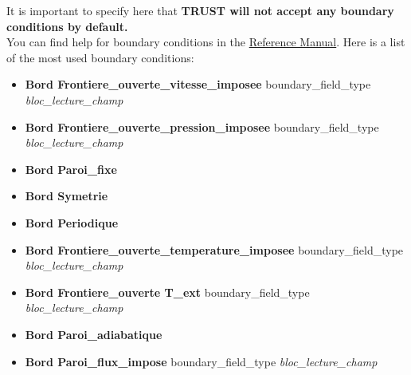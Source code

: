 It is important to specify here that \textbf{TRUST will not accept any boundary conditions by default.}\\

You can find help for boundary conditions in the \href{TRUST_Reference_Manual.pdf\#condlimbase}{\trust Reference Manual}.
Here is a list of the most used boundary conditions:
{\small{
\begin{itemize}
\item \textbf{Bord Frontiere\_ouverte\_vitesse\_imposee}    boundary\_field\_type \textit{bloc\_lecture\_champ}
\item \textbf{Bord Frontiere\_ouverte\_pression\_imposee}   boundary\_field\_type \textit{bloc\_lecture\_champ}
\item \textbf{Bord Paroi\_fixe}
\item \textbf{Bord Symetrie}
\item \textbf{Bord Periodique}
\item \textbf{Bord Frontiere\_ouverte\_temperature\_imposee}                        boundary\_field\_type \textit{bloc\_lecture\_champ}
\item \textbf{Bord Frontiere\_ouverte T\_ext}                       boundary\_field\_type \textit{bloc\_lecture\_champ}
\item \textbf{Bord Paroi\_adiabatique}
\item \textbf{Bord Paroi\_flux\_impose}                             boundary\_field\_type \textit{bloc\_lecture\_champ}

\end{itemize}}}
